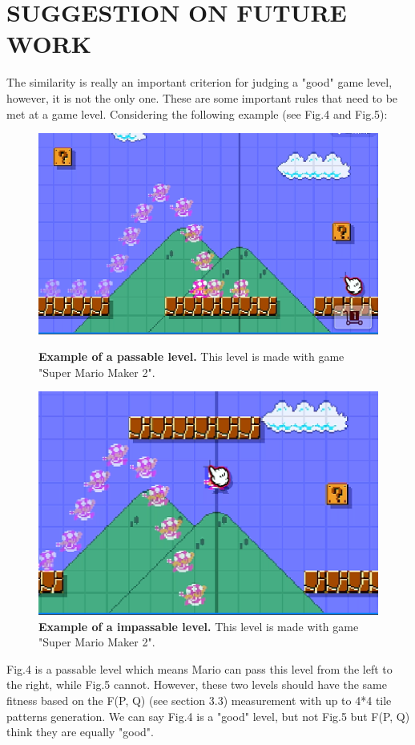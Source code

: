 \documentclass[runningheads]{llncs}
\begin{document}
\section{SUGGESTION ON FUTURE WORK}
The similarity is really an important criterion for judging a "good" game level, however, it is not the only one. These are some important rules that need to be met at a game level. 
Considering the following example (see Fig.4 and Fig.5):
\begin{figure}[!htb]
   \begin{minipage}{0.48\textwidth}
     \centering
     \includegraphics[width=.7\linewidth]{Figure4.eps}
     \caption{\textbf{Example of a passable level.} This level is made with game "Super Mario Maker 2".}\label{Figure4}
   \end{minipage}\hfill
   \begin{minipage}{0.48\textwidth}
     \centering
     \includegraphics[width=.7\linewidth]{Figure5.eps}
     \caption{\textbf{Example of a impassable level.} This level is made with game "Super Mario Maker 2".}\label{Figure5}
   \end{minipage}
\end{figure}

Fig.4 is a passable level which means Mario can pass this level from the left to the right, while Fig.5 cannot. However, these two levels should have the same fitness based on the F(P, Q) (see section 3.3) measurement with up to 4*4 tile patterns generation. We can say Fig.4 is a "good" level, but not Fig.5 but F(P, Q) think they are equally "good".
\end{document}
